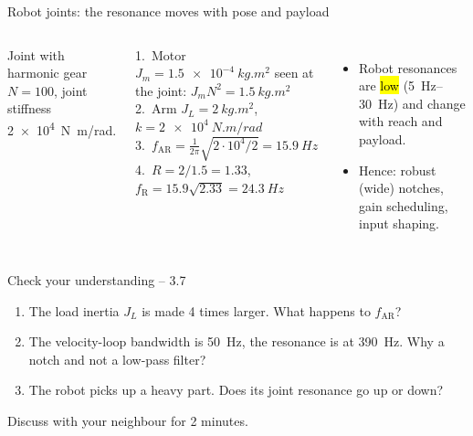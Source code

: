 \documentclass[aspectratio=169,10pt]{beamer}
\newcommand{\dat}[1]{data/#1.dat}
\begin{document}
\begin{frame}[t]{Robot joints: the resonance moves with pose and payload}
\begin{columns}[T,onlytextwidth]
\centering
{}
{\scriptsize Joint with harmonic gear $N=100$, joint stiffness \SI{2e4}{N.m/rad}.}
\begin{keybox}
\small
1.\ Motor $J_m=\SI{1.5e-4}{kg.m^2}$ seen at the joint: $J_mN^2=\SI{1.5}{kg.m^2}$\\
2.\ Arm $J_L=\SI{2}{kg.m^2}$, $k=\SI{2e4}{N.m/rad}$\\
3.\ $f_\text{AR}=\frac{1}{2\pi}\sqrt{2\cdot10^4/2}=\SI{15.9}{Hz}$\\
4.\ $R=2/1.5=1.33$, $f_\text{R}=15.9\sqrt{2.33}=\SI{24.3}{Hz}$
\end{keybox}
\begin{itemize}\small
\item Robot resonances are \hl{low} (\SIrange{5}{30}{Hz}) and change with reach and payload.
\item Hence: robust (wide) notches, gain scheduling, input shaping.
\end{itemize}
\end{columns}
\end{frame}

\begin{frame}[t]{Check your understanding -- 3.7}
\vspace{4mm}
\begin{keybox}
\large
\begin{enumerate}
\item The load inertia $J_L$ is made 4 times larger. What happens to $f_\text{AR}$?\\[2mm]
\item The velocity-loop bandwidth is \SI{50}{Hz}, the resonance is at \SI{390}{Hz}. Why a notch and not a low-pass filter?\\[2mm]
\item The robot picks up a heavy part. Does its joint resonance go up or down?
\end{enumerate}
\end{keybox}
\vfill
\centering\small\color{mkGray} Discuss with your neighbour for 2 minutes.
\end{frame}
\end{document}

